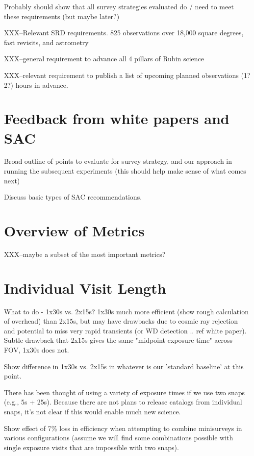 Probably should show that all survey strategies evaluated do / need to meet these requirements (but maybe later?)

XXX--Relevant SRD requirements. 825 observations over 18,000 square degrees, fast revisits, and astrometry

XXX--general requirement to advance all 4 pillars of Rubin science

XXX--relevant requirement to publish a list of upcoming planned observations (1?2?) hours in advance. 

\section{Feedback from white papers and SAC} 
Broad outline of points to evaluate for survey strategy, and our approach in running the subsequent experiments (this should help make sense of what comes next)

Discuss basic types of SAC recommendations. 

\section{Overview of Metrics}
XXX--maybe a subset of the most important metrics? 
%









\section{Individual Visit Length}
What to do - 1x30s vs. 2x15s? 1x30s much more efficient (show rough calculation of overhead) than 2x15s, but may have drawbacks due to cosmic ray rejection and potential to miss very rapid transients (or WD detection .. ref white paper). Subtle drawback that 2x15s gives the same "midpoint exposure time" across FOV, 1x30s does not. 

Show difference in 1x30s vs. 2x15s in whatever is our 'standard baseline' at this point. 

There has been thought of using a variety of exposure times if we use two snaps (e.g., 5s + 25s). Because there are not plans to release catalogs from individual snaps, it's not clear if this would enable much new science.

Show effect of 7\% loss in efficiency when attempting to combine minisurveys in various configurations (assume we will find some combinations possible with single exposure visits that are impossible with two snaps). 

